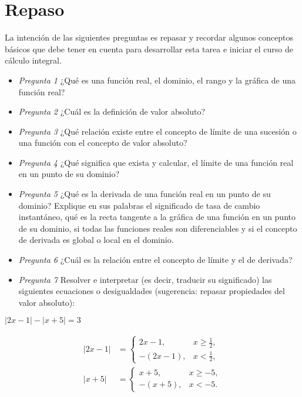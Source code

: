 \section{Repaso}

La intención de las siguientes preguntas es repasar y recordar algunos conceptos básicos que debe tener en cuenta para desarrollar esta tarea e iniciar el curso de cálculo integral.

\begin{itemize}
    \item \textit{Pregunta 1} ¿Qué es una función real, el dominio, el rango y la gráfica de una función real?
    \item \textit{Pregunta 2} ¿Cuál es la definición de valor absoluto?
    \item \textit{Pregunta 3} ¿Qué relación existe entre el concepto de límite de una sucesión o una función con el concepto de valor absoluto?
    \item \textit{Pregunta 4} ¿Qué significa que exista y calcular, el límite de una función real en un punto de su dominio?
    \item \textit{Pregunta 5} ¿Qué es la derivada de una función real en un punto de su dominio? Explique en sus palabras el significado de tasa de cambio instantáneo, qué es la recta tangente a la gráfica de una función en un punto de su dominio, si todas las funciones reales son diferenciables y si el concepto de derivada es global o local en el dominio.
    \item \textit{Pregunta 6} ¿Cuál es la relación entre el concepto de límite y el de derivada?
    \item \textit{Pregunta 7} Resolver e interpretar (es decir, traducir su significado) las siguientes ecuaciones o desigualdades (sugerencia: repasar propiedades del valor absoluto):
\end{itemize}


\hspace*{1cm}$|2x-1|-|x+5|=3$

\begin{align*}
    |2x-1| &=
    \begin{cases}
        2x-1, & x \geq \frac{1}{2}, \\
        -(2x-1), & x < \frac{1}{2},
    \end{cases} \\
    |x+5| &=
    \begin{cases}
        x+5, & x \geq -5, \\
        -(x+5), & x < -5.
    \end{cases}
\end{align*}

